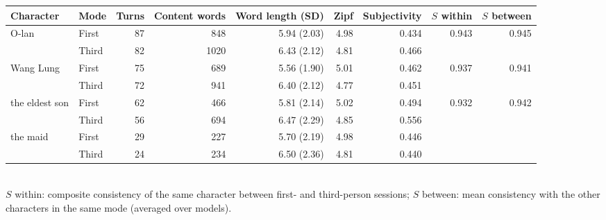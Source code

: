 \begin{tabular}{llrrrrrrr}
\toprule
Character & Mode & Turns & Content words & Word length (SD) & Zipf & Subjectivity & $S$ within & $S$ between \\
\midrule
O-lan & First & 87 & 848 & 5.94 (2.03) & 4.98 & 0.434 & 0.943 & 0.945 \\
 & Third & 82 & 1020 & 6.43 (2.12) & 4.81 & 0.466 &  &  \\
Wang Lung & First & 75 & 689 & 5.56 (1.90) & 5.01 & 0.462 & 0.937 & 0.941 \\
 & Third & 72 & 941 & 6.40 (2.12) & 4.77 & 0.451 &  &  \\
the eldest son & First & 62 & 466 & 5.81 (2.14) & 5.02 & 0.494 & 0.932 & 0.942 \\
 & Third & 56 & 694 & 6.47 (2.29) & 4.85 & 0.556 &  &  \\
the maid & First & 29 & 227 & 5.70 (2.19) & 4.98 & 0.446 &  &  \\
 & Third & 24 & 234 & 6.50 (2.36) & 4.81 & 0.440 &  &  \\
\bottomrule
\end{tabular}
\\[2pt]
{\footnotesize $S$ within: composite consistency of the same character between first- and third-person sessions; $S$ between: mean consistency with the other characters in the same mode (averaged over models).}
